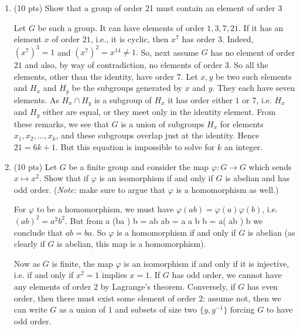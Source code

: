 \documentclass[11pt,reqno]{amsart}
\newcommand{\rr}{\rightarrow}
\begin{document}
\begin{enumerate}

\item (10 pts) Show that a group of order 21 must contain an element of order $3$

\begin{solutionbox}
	Let $G$ be such a group. It can have elements of order $1, 3, 7, 21$. If it has an element $x$ of order $21$, i.e., it is cyclic, then $x^7$ has order $3$. Indeed, $(x^7)^3=1$ and $(x^7)^2=x^{14} \neq 1.$ 
	So, next assume $G$ has no element of order $21$ and also, by way of contradiction, no elements of order $3$. So all the elements, other than the identity, have order $7$. Let $x, y$ be two such elements and $H_x$ and $H_y$  be the subgroups generated by $x$ and $y$. They each have seven elements. As $H_x \cap H_y$ is a subgroup of $H_x$ it has order either $1$ or $7$, i.e. $H_x$ and $H_y$ either are equal, or they meet only in the identity element. From these remarks, we see that $G$ is a union of subgroups $H_x$ for elements $x_1, x_2, \ldots, x_k$, and these subgroups overlap just at the identity. Hence $21 = 6k+1$. But this equation is impossible to solve for $k$ an integer.  
	
	
\end{solutionbox}
	
	


\vspace{0.15in} 

\item (10 pts) Let $G$ be a finite group and consider the map $\varphi: G \rr G$ which sends $x \mapsto x^2$. Show that if $\varphi$ is an isomorphism if and only if $G$ is abelian and has odd order. (\textit{Note:} make sure to argue that $\varphi$ is a homomorphism as well.)

\begin{solutionbox}
For $\varphi$ to be a homomorphism, we must have $\varphi(ab)= \varphi(a) \varphi(b)$, i.e. $(ab)^2 = a^2 b^2 $. But from \be a (ba ) b = ab ab = a a b b = a( ab ) b \ee we conclude that $ab = ba$. So $\varphi$ is a homomorphism if and only if $G$ is abelian (as clearly if $G$ is abelian, this map is a homomorphism).

Now as $G$ is finite, the map $\varphi$ is an isomorphism if and only if it is injective, i.e. if and only if $x^2=1$ implies $x=1$. If $G$ has odd order, we cannot have any elements of order $2$ by Lagrange's theorem. Conversely, if $G$ has even order, then there must exist some element of order $2$: assume not, then we can write $G$ as a union of $1$ and subsets of size two $\{ y, y^{-1}\}$ forcing $G$ to have odd order. 


\end{solutionbox}
\end{enumerate}
\end{document}

